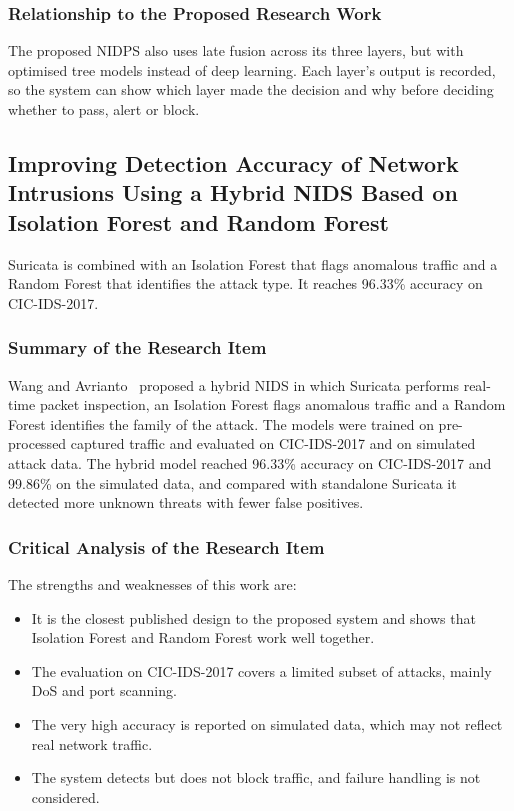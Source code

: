 \subsubsection{Relationship to the Proposed Research Work}\label{sec:3.2.6.3}

\noindent The proposed NIDPS also uses late fusion across its three layers, but with optimised tree models instead of deep learning. Each layer's output is recorded, so the system can show which layer made the decision and why before deciding whether to pass, alert or block.

\subsection{Improving Detection Accuracy of Network Intrusions Using a Hybrid NIDS Based on Isolation Forest and Random Forest}\label{sec:3.2.7}

\noindent Suricata is combined with an Isolation Forest that flags anomalous traffic and a Random Forest that identifies the attack type. It reaches 96.33\% accuracy on CIC-IDS-2017.

\subsubsection{Summary of the Research Item}\label{sec:3.2.7.1}

\noindent Wang and Avrianto~\cite{lr:wang2025} proposed a hybrid NIDS in which Suricata performs real-time packet inspection, an Isolation Forest flags anomalous traffic and a Random Forest identifies the family of the attack. The models were trained on pre-processed captured traffic and evaluated on CIC-IDS-2017 and on simulated attack data. The hybrid model reached 96.33\% accuracy on CIC-IDS-2017 and 99.86\% on the simulated data, and compared with standalone Suricata it detected more unknown threats with fewer false positives.

\subsubsection{Critical Analysis of the Research Item}\label{sec:3.2.7.2}

\noindent The strengths and weaknesses of this work are:

\begin{itemize}
\item It is the closest published design to the proposed system and shows that Isolation Forest and Random Forest work well together.
\item The evaluation on CIC-IDS-2017 covers a limited subset of attacks, mainly DoS and port scanning.
\item The very high accuracy is reported on simulated data, which may not reflect real network traffic.
\item The system detects but does not block traffic, and failure handling is not considered.
\end{itemize}

